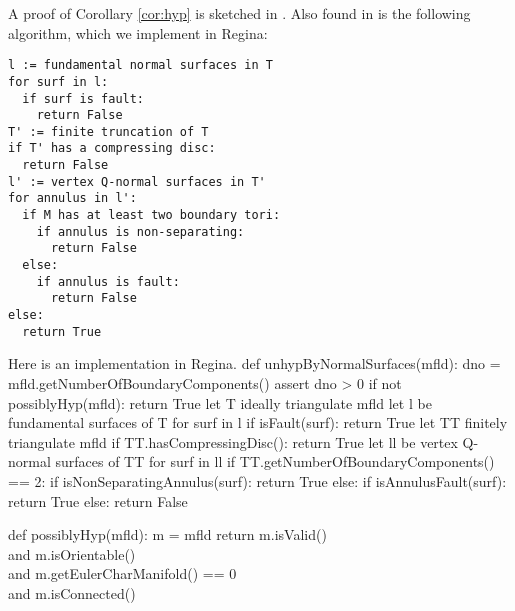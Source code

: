 \documentclass[10pt,twocolumn]{article}%
\theoremstyle{definition}
\begin{document}
\nwenddocs{}\nwdocspar
A proof of Corollary \ref{cor:hyp} is
sketched in \cite{Me}. Also found 
in \cite{Me} is the following algorithm,
which we implement in {\Tt{}Regina\nwendquote}:
\begin{verbatim}
l := fundamental normal surfaces in T
for surf in l:
  if surf is fault:
    return False
T' := finite truncation of T
if T' has a compressing disc:
  return False
l' := vertex Q-normal surfaces in T'
for annulus in l':
  if M has at least two boundary tori:
    if annulus is non-separating:
      return False
  else:
    if annulus is fault:
      return False
else:
  return True
\end{verbatim}
Here is an implementation in {\Tt{}Regina\nwendquote}.
\nwenddocs{}\endmoddef\nwstartdeflinemarkup\nwenddeflinemarkup
def unhypByNormalSurfaces(mfld):
  dno = mfld.getNumberOfBoundaryComponents()
  assert dno > 0
  if not possiblyHyp(mfld):
    return True
  \LA{}let T ideally triangulate mfld\RA{}
  \LA{}let l be fundamental surfaces of T\RA{}
  \LA{}for surf in l\RA{}
    if isFault(surf):
      return True
  \LA{}let TT finitely triangulate mfld\RA{}
  if TT.hasCompressingDisc():
    return True
  \LA{}let ll be vertex Q-normal surfaces of TT\RA{}
  \LA{}for surf in ll\RA{}
    if TT.getNumberOfBoundaryComponents() == 2:
      if isNonSeparatingAnnulus(surf):
        return True
    else:
      if isAnnulusFault(surf):
        return True
  else:
    return False

\nwendcode{}\endmoddef\nwstartdeflinemarkup\nwenddeflinemarkup
def possiblyHyp(mfld):
  m = mfld
  return m.isValid() \\
     and m.isOrientable() \\
     and m.getEulerCharManifold() == 0 \\
     and m.isConnected()
\end{document}
